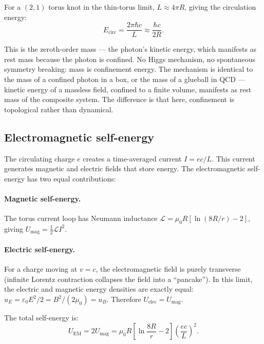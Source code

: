 \documentclass[11pt,a4paper]{article}
\begin{document}
For a $(2,1)$ torus knot in the thin-torus limit, $L \approx 4\pi R$, giving the circulation energy:
\begin{equation}
  E_{\text{circ}} = \frac{2\pi\hbar c}{L} \approx \frac{\hbar c}{2R}.
  \label{eq:circ-energy}
\end{equation}

This is the zeroth-order mass --- the photon's kinetic energy, which manifests as rest mass because the photon is confined. No Higgs mechanism, no spontaneous symmetry breaking: mass is confinement energy. The mechanism is identical to the mass of a confined photon in a box, or the mass of a glueball in QCD --- kinetic energy of a massless field, confined to a finite volume, manifests as rest mass of the composite system. The difference is that here, confinement is topological rather than dynamical.

\subsection{Electromagnetic self-energy}

The circulating charge $e$ creates a time-averaged current $I = ec/L$. This current generates magnetic and electric fields that store energy. The electromagnetic self-energy has two equal contributions:

\paragraph{Magnetic self-energy.}
The torus current loop has Neumann inductance $\mathcal{L} = \mu_0 R[\ln(8R/r) - 2]$, giving $U_{\text{mag}} = \tfrac{1}{2}\mathcal{L}I^2$.

\paragraph{Electric self-energy.}
For a charge moving at $v = c$, the electromagnetic field is purely transverse (infinite Lorentz contraction collapses the field into a ``pancake''). In this limit, the electric and magnetic energy densities are exactly equal: $u_E = \varepsilon_0 E^2/2 = B^2/(2\mu_0) = u_B$. Therefore $U_{\text{elec}} = U_{\text{mag}}$.

The total self-energy is:
\begin{equation}
  U_{\text{EM}} = 2U_{\text{mag}} = \mu_0 R\left[\ln\frac{8R}{r} - 2\right]\left(\frac{ec}{L}\right)^{\!2}.
  \label{eq:self-energy}
\end{equation}
\end{document}
